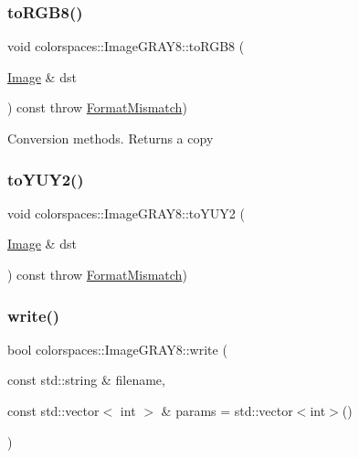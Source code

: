 \subsubsection{\texorpdfstring{to\+R\+G\+B8()}{toRGB8()}}
{\footnotesize\ttfamily void colorspaces\+::\+Image\+G\+R\+A\+Y8\+::to\+R\+G\+B8 (\begin{DoxyParamCaption}\item[{\hyperlink{classcolorspaces_1_1_image}{Image} \&}]{dst }\end{DoxyParamCaption}) const throw  \hyperlink{classcolorspaces_1_1_image_1_1_format_mismatch}{Format\+Mismatch}) }

Conversion methods. Returns a copy \mbox{\label{classcolorspaces_1_1_image_g_r_a_y8_a5970d76be3f354a79dd94f96fb7df2ff}} 
\subsubsection{\texorpdfstring{to\+Y\+U\+Y2()}{toYUY2()}}
{\footnotesize\ttfamily void colorspaces\+::\+Image\+G\+R\+A\+Y8\+::to\+Y\+U\+Y2 (\begin{DoxyParamCaption}\item[{\hyperlink{classcolorspaces_1_1_image}{Image} \&}]{dst }\end{DoxyParamCaption}) const throw  \hyperlink{classcolorspaces_1_1_image_1_1_format_mismatch}{Format\+Mismatch}) }

\mbox{\label{classcolorspaces_1_1_image_g_r_a_y8_a559cfcb61640fef0a6c5f3eedc521996}} 
\subsubsection{\texorpdfstring{write()}{write()}}
{\footnotesize\ttfamily bool colorspaces\+::\+Image\+G\+R\+A\+Y8\+::write (\begin{DoxyParamCaption}\item[{const std\+::string \&}]{filename,  }\item[{const std\+::vector$<$ int $>$ \&}]{params = {\ttfamily std\+:\+:vector$<$int$>$()} }\end{DoxyParamCaption})}

